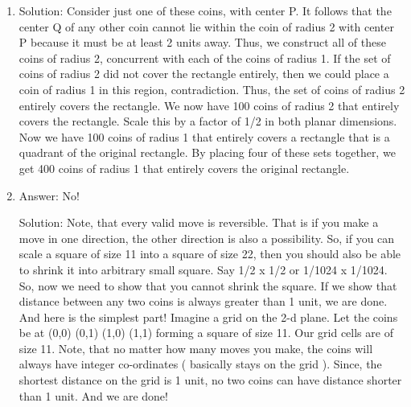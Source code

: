 \begin{enumerate}

\item
Solution: Consider just one of these coins, with center P. It follows that the center Q of any other coin cannot lie within the coin of radius 2 with center P because it must be at least 2 units away. Thus, we construct all of these coins of radius 2, concurrent with each of the coins of radius 1. If the set of coins of radius 2 did not cover the rectangle entirely, then we could place a coin of radius 1 in this region, contradiction. Thus, the set of coins of radius 2 entirely covers the rectangle.
We now have 100 coins of radius 2 that entirely covers the rectangle. Scale this by a factor of 1/2 in both planar dimensions. Now we have 100 coins of radius 1 that entirely covers a rectangle that is a quadrant of the original rectangle. By placing four of these sets together, we get 400 coins of radius 1 that entirely covers the original rectangle.




\item
Answer: No!
 
Solution: Note, that every valid move is reversible. That is if you make a move in one direction, the other direction is also a possibility. So, if you can scale a square of size 11 into a square of size 22, then you should also be able to shrink it into arbitrary small square. Say 1/2 x 1/2 or 1/1024 x 1/1024.
So, now we need to show that you cannot shrink the square. If we show that distance between any two coins is always greater than 1 unit, we are done. And here is the simplest part!
Imagine a grid on the 2-d plane. Let the coins be at (0,0) (0,1) (1,0) (1,1) forming a square of size 11. Our grid cells are of size 11. Note, that no matter how many moves you make, the coins will always have integer co-ordinates ( basically stays on the grid ). Since, the shortest distance on the grid is 1 unit, no two coins can have distance shorter than 1 unit. And we are done!





\end{enumerate}
